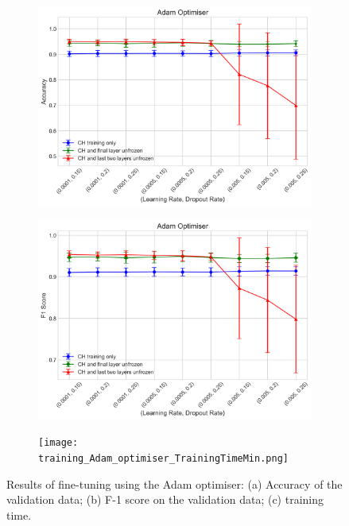 \documentclass[a4paper,12pt]{article}
\newcommand{\figwidthh}{0.48\textwidth}
\begin{document}
\begin{figure}[p] 
	\begin{center}
		\begin{subfigure}[b]{\figwidthh}
			\caption{} 
			\includegraphics[width=\textwidth]{Adam_optimiser_accuracy.png}
		\end{subfigure}
        \hfill
		\begin{subfigure}[b]{\figwidthh}
			\caption{}
			\includegraphics[width=\textwidth]{Adam_optimiser_f1_score.png}
		\end{subfigure}
        \hfill
		\begin{subfigure}[b]{\figwidthh}
			\caption{}
			\texttt{[image: training\_Adam\_optimiser\_TrainingTimeMin.png]}
		\end{subfigure}
	\end{center}
	\caption{Results of fine-tuning using the Adam optimiser: (a) Accuracy of the validation data; (b) F-1 score on the validation data; (c) training time. 
	} 
	\label{fig:res_training_adam}
\end{figure}
\end{document}
